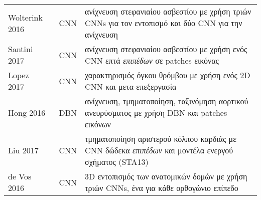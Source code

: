 \begin{sidewaystable}
\begin{tabular}{l c l}
		Wolterink 2016~\cite{wolterink2016automatic}  & CNN             & ανίχνευση στεφανιαίου ασβεστίου με χρήση τριών CNNs για τον εντοπισμό και δύο CNN για την ανίχνευση                                                                                                                                                                                                                                                                                         \\
		Santini 2017~\cite{santini2017automatic}      & CNN             & ανίχνευση στεφανιαίου ασβεστίου με χρήση ενός CNN επτά \textit{επιπέδων} σε patches εικόνας                                                                                                                                                                                                                                                                                                 \\
		Lopez 2017~\cite{lopez2017dcnn}               & CNN             & χαρακτηρισμός όγκου θρόμβου με χρήση ενός 2D CNN και μετα-επεξεργασία                                                                                                                                                                                                                                                                                                                       \\
		Hong 2016~\cite{hong2016automatic}            & DBN             & ανίχνευση, τμηματοποίηση, ταξινόμηση αορτικού ανευρύσματος με χρήση DBN και patches εικόνων                                                                                                                                                                                                                                                                                                 \\
		Liu 2017~\cite{liu2017left}                   & CNN             & τμηματοποίηση αριστερού κόλπου καρδιάς με CNN δώδεκα \textit{επιπέδων} και μοντέλα ενεργού σχήματος (STA13)                                                                                                                                                                                                                                                                           \\
		de Vos 2016~\cite{de20162d}                   & CNN             & 3D εντοπισμός των ανατομικών δομών με χρήση τριών CNNs, ένα για κάθε ορθογώνιο επίπεδο                                                                                                                                                                                                                                                                                                      \\

\end{tabular}
\end{sidewaystable}
